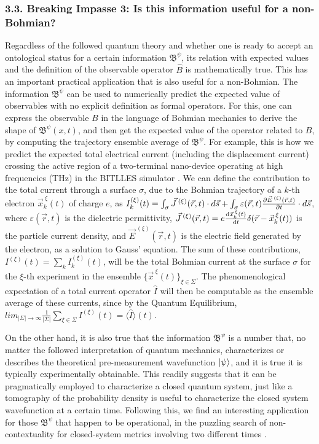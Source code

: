 \documentclass[11pt, a4paper]{article} %
\newcommand{\B}{\mathfrak{B}}
\begin{document}
\subsubsection*{3.3. Breaking Impasse 3: Is this information useful for a non-Bohmian?}
\vspace{-0.15cm}
Regardless of the followed quantum theory and whether one is ready to accept an ontological status for a certain information $\B^\psi$, its relation with expected values and the definition of the observable operator $\hat{B}$ is mathematically true. This has an important practical application that is also useful for a non-Bohmian. The information $\B^\psi$ can be used to numerically predict the expected value of observables with no explicit definition as formal operators. For this, one can express the observable $B$ in the language of Bohmian mechanics to derive the shape of $\B^\psi(x,t)$, and then get the expected value of the operator related to $B$, by computing the trajectory ensemble average of $\B^\psi$. For example, this is how we predict the expected total electrical current (including the displacement current) crossing the active region of a two-terminal nano-device operating at high frequencies (THz) in the BITLLES simulator \cite{equiv, Pel}. We can define the contribution to the total current through a surface $\sigma$, due to the Bohmian trajectory of a $k$-th electron $\vec{x}_k^{\:\xi}(t)$ of charge $e$, as $I_k^{(\xi)}(t)=\int_\sigma \vec{J}^{\:(\xi)}(\vec{r},t)\cdot d\vec{s}+\int_\sigma \varepsilon(\vec{r},t)\pdv{\vec{E}^{\:(\xi)}(\vec{r},t)}{t}\cdot d\vec{s}$, where $\varepsilon(\vec{r},t)$ is the dielectric permittivity, $\vec{J}^{\:(\xi)}(\vec{r},t)=e\dv{\vec{x}_k^{\:\xi}(t)}{t}\delta(\vec{r}-\vec{x}_k^{\:\xi}(t))$ is the particle current density, and $\vec{E}^{\:(\xi)}(\vec{r},t)$ is the electric field generated by the electron, as a solution to Gauss' equation. The sum of these contributions, $I^{(\xi)}(t)=\sum_k I^{(\xi)}_k(t)$, will be the total Bohmian current at the surface $\sigma$ for the $\xi$-th experiment in the ensemble $\{\vec{x}^{\:\xi}(t)\}_{\xi\in \Sigma}$. The phenomenological expectation of a total current operator $\hat{I}$ will then be computable as the ensemble average of these currents, since by the Quantum Equilibrium, $lim_{|\Sigma|\rightarrow \infty}\frac{1}{|\Sigma|} \sum_{\xi\in\Sigma} I^{(\xi)}(t)=\langle \hat{I}\rangle(t)$.

On the other hand, it is also true that the information $\B^\psi$ is a number that, no matter the followed interpretation of quantum mechanics, characterizes or describes the theoretical pre-measurement wavefunction $\ket{\psi}$, and it is true it is typically experimentally obtainable. This readily suggests that it can be pragmatically employed to characterize a closed quantum system, just like a tomography of the probability density is useful to characterize the closed system wavefunction at a certain time. Following this, we find an interesting application for those $\B^\psi$ that happen to be operational, in the puzzling search of non-contextuality for closed-system metrics involving two different times \cite{DevInPosition1}.
\end{document}
